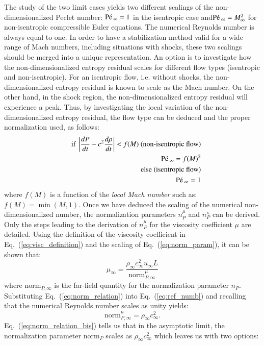 \documentclass[preprint,10pt]{elsarticle}
\newcommand{\norm}{\textrm{norm}}
\newcommand{\Pe}{\textrm{P\'e\,}}
\newcommand{\eqt}[1]{Eq.~(\ref{#1})}                     %
\begin{document}
The study of the two limit cases yields two different scalings of the non-dimensionalized Peclet number: $\Pe_\infty = 1$ in the isentropic case and$\Pe_\infty  = M_\infty^2$ for non-isentropic compressible Euler equations. The numerical Reynolds number is always equal to one. In order to have a stabilization method valid for a wide range of Mach numbers, including situations with shocks, these two scalings should be merged into a unique representation. An option is to investigate how the non-dimensionalized entropy residual scales for different flow types (isentropic and non-isentropic). For an isentropic flow, i.e. without shocks, the non-dimensionalized entropy residual is known to scale as the Mach number. On the other hand, in the shock region, the non-dimensionalized entropy residual will experience a peak. Thus, by investigating the local variation of the non-dimensionalized entropy residual, the flow type can be deduced and the proper normalization used, as follows:
\begin{eqnarray}  \label{eq:norm_ent}
&&\text{if } \left| \frac{dP}{dt} - c^2 \frac{d \rho}{dt} \right| < f(M) \text{ (non-isentropic flow)}\nonumber \\
&&\Pe_\infty = f(M)^2 \nonumber \\
&&\text{else (isentropic flow)}\\
&&\Pe_\infty = 1 \nonumber
\end{eqnarray}
where $f(M)$ is a function of the \emph{local Mach number} such as: $f(M) = \min (M, 1)$. Once we have deduced the scaling of the numerical non-dimensionalized number, the normalization parameters $n_P^{\mu}$ and $n_P^{\kappa}$ can be derived. Only the steps leading to the derivation of $n_P^{\mu}$ for the viscosity coefficient $\mu$ are detailed. Using the definition of the viscosity coefficient in \eqt{eq:visc_definition} and the scaling of \eqt{eq:norm_param}, it can be shown that:
%
\begin{equation}
\label{eq:norm_relation}
\mu_\infty = \frac{ \rho_\infty c_\infty^2 u_\infty L }{ \norm_{P,\infty}^{\mu} } 
\end{equation}
%
where $\norm_{P,\infty}$ is the far-field quantity for the normalization parameter $n_P$. Substituting \eqt{eq:norm_relation} into \eqt{eq:ref_numb} and recalling that the numerical Reynolds number scales as unity yields:
%
\begin{equation}
\label{eq:norm_relation_bis}
\norm_{P,\infty}^{\mu} = \rho_\infty c_\infty^2 .
\end{equation}
%
\eqt{eq:norm_relation_bis} tells us that in the asymptotic limit, the normalization parameter $\norm_P$ scales as $\rho_\infty c_\infty^2$ which leaves us with two options:
\end{document}
